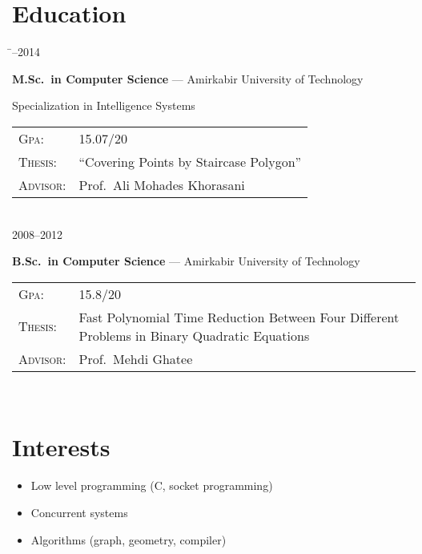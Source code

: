 \documentclass[a4paper,10pt]{article}
\newcommand{\follownote}[1]{--- {\footnotesize\color{darkblue}#1}}
\begin{document}
\section*{{\color{red}Education}}
\begin{tabbing}
\hspace{2.5cm}\=--2014 \>\parbox[t]{10.5cm}{
	\textbf{M.Sc.\ in Computer Science}
	\follownote{Amirkabir University of Technology}

	Specialization in Intelligence Systems

	\begin{tabular}{p{1.5cm}p{8cm}}
	\textsc{Gpa}: & 15.07/20 \\
	\textsc{Thesis}: & ``Covering Points by Staircase Polygon'' \\
	\textsc{Advisor}: & Prof.\ Ali Mohades Khorasani
	\end{tabular}
} \\[2mm]
2008--2012 \>\parbox[t]{10.5cm}{
	\textbf{B.Sc.\ in Computer Science}
	\follownote{Amirkabir University of Technology}

	\begin{tabular}{p{1.5cm}p{8cm}}
	\textsc{Gpa}: & 15.8/20 \\
	\textsc{Thesis}: & Fast Polynomial Time Reduction
	    Between Four Different Problems in Binary Quadratic
	    Equations \\
	\textsc{Advisor}: & Prof.\ Mehdi Ghatee
	\end{tabular}
} \\[2mm]
\end{tabbing}

\section*{{\color{blue}Interests}}
\begin{itemize}
	\item Low level programming (C, socket programming)
	\item Concurrent systems
	\item Algorithms (graph, geometry, compiler)
\end{itemize}
\end{document}
